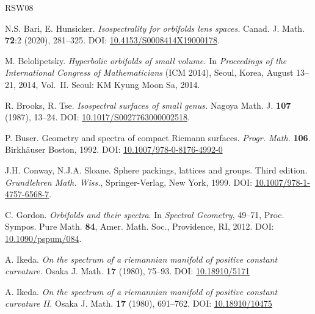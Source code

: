 \documentclass[12pt,a4paper,final]{amsart}
\theoremstyle{plain}
\theoremstyle{definition}
\theoremstyle{remark}
\numberwithin{equation}{section}
\begin{document}



\begin{thebibliography}{RSW08}
    
    {\sc N.S. Bari, E. Hunsicker}.
    {\it Isospectrality for orbifolds lens spaces.}
    Canad. J. Math. \textbf{72}:2 (2020), 281--325.
    DOI: \href{https://doi.org/10.4153/S0008414X19000178} {10.4153/S0008414X19000178}.
    
    {\sc M. Belolipetsky}.
    {\it Hyperbolic orbifolds of small volume.}
    In \textsl{Proceedings of the International Congress of Mathematicians} (ICM 2014), Seoul, Korea, August 13--21, 2014, Vol.~II. 
    Seoul: KM Kyung Moon Sa, 2014.
    
    {\sc R. Brooks, R. Tse}.
    {\it Isospectral surfaces of small genus.}
    Nagoya Math. J. \textbf{107} (1987), 13--24.
    DOI: \href{https://doi.org/10.1017/S0027763000002518} {10.1017/S0027763000002518}.    
    
    
    {\sc P. Buser}.
    Geometry and spectra of compact Riemann surfaces.
    {\it Progr. Math.} \textbf{106}.
    Birkh\"auser Boston, 1992.
    DOI: \href{https://doi.org/10.1007/978-0-8176-4992-0} {10.1007/978-0-8176-4992-0}
    
    {\sc J.H. Conway, N.J.A. Sloane}.
    Sphere packings, lattices and groups.
    Third edition. \textit{Grundlehren Math. Wiss.}, Springer-Verlag, New York, 1999.
    DOI: \href{http://dx.doi.org/10.1007/978-1-4757-6568-7} {10.1007/978-1-4757-6568-7}.
    
    {\sc C. Gordon}.
    {\it Orbifolds and their spectra}.
    In \textsl{Spectral Geometry}, 49--71,
    Proc. Sympos. Pure Math. \textbf{84}, Amer. Math. Soc., Providence, RI, 2012.
    DOI: \href{http://dx.doi.org/10.1090/pspum/084} {10.1090/pspum/084}.
    
    
    {\sc A. Ikeda}.
    {\it On the spectrum of a riemannian manifold of positive constant curvature.}
    Osaka J. Math. \textbf{17} (1980), 75--93.
    DOI: \href{http://dx.doi.org/10.18910/5171} {10.18910/5171}
    
    {\sc A. Ikeda}.
    {\it On the spectrum of a riemannian manifold of positive constant curvature II.}
    Osaka J. Math. \textbf{17} (1980), 691--762.
    DOI: \href{http://dx.doi.org/10.18910/10475} {10.18910/10475}
    

\end{thebibliography}
\end{document}
